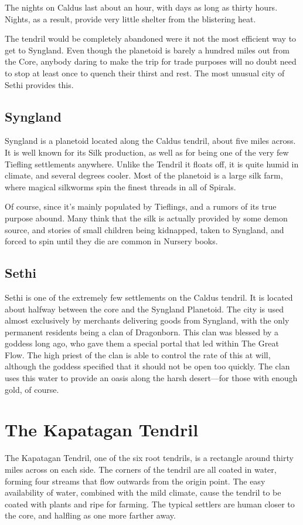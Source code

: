 \begin{multicols}{2}
The nights on Caldus last about an hour, with days as long as thirty hours.
Nights, as a result, provide very little shelter from the blistering heat.

The tendril would be completely abandoned were it not the most efficient way to get to Syngland.
Even though the planetoid is barely a hundred miles out from the Core, anybody daring to make the trip for trade purposes will no doubt need to stop at least once to quench their thirst and rest.
The most unusual city of Sethi provides this.

\subsection{Syngland}
Syngland is a planetoid located along the Caldus tendril, about five miles across.
It is well known for its Silk production, as well as for being one of the very few Tiefling settlements anywhere.
Unlike the Tendril it floats off, it is quite humid in climate, and several degrees cooler.
Most of the planetoid is a large silk farm, where magical silkworms spin the finest threads in all of Spirals.

Of course, since it's mainly populated by Tieflings, and a rumors of its true purpose abound.
Many think that the silk is actually provided by some demon source, and stories of small children being kidnapped, taken to Syngland, and forced to spin until they die are common in Nursery books.

\subsection{Sethi}
Sethi is one of the extremely few settlements on the Caldus tendril.
It is located about halfway between the core and the Syngland Planetoid.
The city is used almost exclusively by merchants delivering goods from Syngland, with the only permanent residents being a clan of Dragonborn.
This clan was blessed by a goddess long ago, who gave them a special portal that led within The Great Flow.
The high priest of the clan is able to control the rate of this at will, although the goddess specified that it should not be open too quickly.
The clan uses this water to provide an oasis along the harsh desert---for those with enough gold, of course. 



\section{The Kapatagan Tendril}
The Kapatagan Tendril, one of the six root tendrils, is a rectangle around thirty miles across on each side.
The corners of the tendril are all coated in water, forming four streams that flow outwards from the origin point.
The easy availability of water, combined with the mild climate, cause the tendril to be coated with plants and ripe for farming.
The typical settlers are human closer to the core, and halfling as one more farther away. 


\end{multicols}
